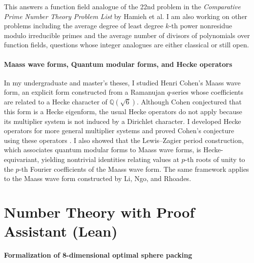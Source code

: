 \documentclass[letterpaper, 10pt]{article}
\begin{document}
This answers a function field analogue of the 22nd problem in the \emph{Comparative Prime Number Theory Problem List} by Hamieh et al.
I am also working on other problems including the average degree of least degree $k$-th power nonresidue modulo irreducible primes and the average number of divisors of polynomials over function fields, questions whose integer analogues are either classical or still open.


\paragraph{Maass wave forms, Quantum modular forms, and Hecke operators}

In my undergraduate and master's theses, I studied Henri Cohen's Maass wave form, an explicit form constructed from a Ramanujan $q$-series whose coefficients are related to a Hecke character of $\mathbb{Q}(\sqrt{6})$. Although Cohen conjectured that this form is a Hecke eigenform, the usual Hecke operators do not apply because its multiplier system is not induced by a Dirichlet character. I developed Hecke operators for more general multiplier systems and proved Cohen's conjecture using these operators \cite{lee2018quantum,lee2019maass}. I also showed that the Lewis--Zagier period construction, which associates quantum modular forms to Maass wave forms, is Hecke-equivariant, yielding nontrivial identities relating values at $p$-th roots of unity to the $p$-th Fourier coefficients of the Maass wave form. The same framework applies to the Maass wave form constructed by Li, Ngo, and Rhoades.


\newpage
\section{Number Theory with Proof Assistant (Lean)}


\paragraph{Formalization of 8-dimensional optimal sphere packing}
\end{document}
